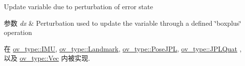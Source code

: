 Update variable due to perturbation of error state 


\begin{DoxyParams}{参数}
{\em dx} & Perturbation used to update the variable through a defined \char`\"{}boxplus\char`\"{} operation \\
\hline
\end{DoxyParams}


在 \hyperlink{classov__type_1_1IMU_ac40233687ffc481f5d4d1ebaaf882577}{ov\+\_\+type\+::\+I\+MU}, \hyperlink{classov__type_1_1Landmark_aae8c688f5bb601edcb38fde41ff04297}{ov\+\_\+type\+::\+Landmark}, \hyperlink{classov__type_1_1PoseJPL_a8c961e8638cdc37a2b37c1fa50fc67a2}{ov\+\_\+type\+::\+Pose\+J\+PL}, \hyperlink{classov__type_1_1JPLQuat_af0a26f1b03bc7c89abad5dfd985c61cd}{ov\+\_\+type\+::\+J\+P\+L\+Quat} , 以及 \hyperlink{classov__type_1_1Vec_a7d66e9414946807c9469de0a1038256d}{ov\+\_\+type\+::\+Vec} 内被实现.

